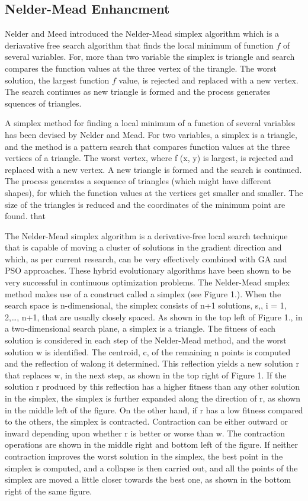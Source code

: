 \documentclass[a4paper,twoside]{article}
\begin{document}
 \subsection{Nelder-Mead Enhancment}

Nelder and Meed introduced the Nelder-Mead simplex algorithm which is a deriavative free  search algorithm that finds the local minimum of function $f$ of several variables. For, more than two variable the simplex is triangle and search compares the function values at the three vertex of the tirangle. The worst solution, the largest function $f$ value, is rejected and replaced with a new vertex. The search continues as new triangle is formed and the process generates squences of triangles. %
  
A simplex method for finding a local minimum of a function of several variables has
been devised by Nelder and Mead. For two variables, a simplex is a triangle, and
the method is a pattern search that compares function values at the three vertices of a
triangle. The worst vertex, where f (x, y) is largest, is rejected and replaced with a new
vertex. A new triangle is formed and the search is continued. The process generates
a sequence of triangles (which might have different shapes), for which the function
values at the vertices get smaller and smaller. The size of the triangles is reduced and
the coordinates of the minimum point are found. that %


The Nelder-Mead simplex algorithm is a derivative-free local search technique
that is capable of moving a cluster of solutions in the gradient direction and which, as per current research, can be very effectively combined with GA and PSO approaches. These hybrid evolutionary algorithms have been shown to be very successful in continuous optimization problems.
The Nelder-Mead smplex method makes use of a construct called a simplex (see
Figure 1.). When the search space is n-dimensional, the simplex consists of n+1 solutions, s,, i = {1, 2,\dots  , n+1}, that are usually closely spaced. As shown in the top left of Figure 1., in a two-dimensional search plane, a simplex is a triangle. The fitness of each solution is considered in each step of the Nelder-Mead method, and the worst solution w is identified. The centroid, c, of the remaining n points is computed and the reflection of walong it determined. This reflection yields a new solution r that replaces w, in the next step, as shown in the top right of Figure 1. If the solution r produced by this reflection has a higher fitness than any other solution in the simplex, the simplex is further expanded along the direction of r, as shown in the middle left of the figure. On the other hand, if r has a low fitness compared to the others, the simplex is contracted. Contraction can be either outward or inward depending upon whether r is better or worse than w. The contraction operations are shown in the middle right and bottom left of the figure. If neither contraction improves the worst solution in the simplex, the best point in the simplex is computed, and a collapse is then carried out, and all the points of the simplex are moved a little closer towards the best one, as shown in the bottom right of the same figure.
\end{document}
